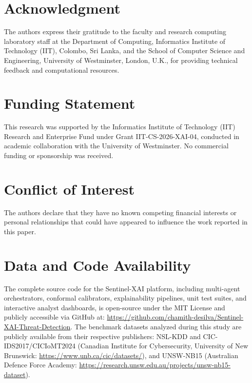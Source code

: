 \documentclass{ieeeaccess}
\begin{document}
\section*{Acknowledgment}
The authors express their gratitude to the faculty and research computing laboratory staff at the Department of Computing, Informatics Institute of Technology (IIT), Colombo, Sri Lanka, and the School of Computer Science and Engineering, University of Westminster, London, U.K., for providing technical feedback and computational resources.

\section*{Funding Statement}
This research was supported by the Informatics Institute of Technology (IIT) Research and Enterprise Fund under Grant IIT-CS-2026-XAI-04, conducted in academic collaboration with the University of Westminster. No commercial funding or sponsorship was received.

\section*{Conflict of Interest}
The authors declare that they have no known competing financial interests or personal relationships that could have appeared to influence the work reported in this paper.

\section*{Data and Code Availability}
The complete source code for the Sentinel-XAI platform, including multi-agent orchestrators, conformal calibrators, explainability pipelines, unit test suites, and interactive analyst dashboards, is open-source under the MIT License and publicly accessible via GitHub at: \url{https://github.com/chamith-desilva/Sentinel-XAI-Threat-Detection}. The benchmark datasets analyzed during this study are publicly available from their respective publishers: NSL-KDD and CIC-IDS2017/CICIoMT2024 (Canadian Institute for Cybersecurity, University of New Brunswick: \url{https://www.unb.ca/cic/datasets/}), and UNSW-NB15 (Australian Defence Force Academy: \url{https://research.unsw.edu.au/projects/unsw-nb15-dataset}).
\end{document}
